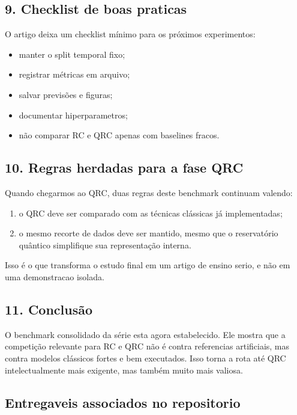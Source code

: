 \documentclass[12pt]{article}
\providecommand{\tightlist}{%
          \setlength{\itemsep}{0pt}\setlength{\parskip}{0pt}}
\begin{document}
\subsection{9. Checklist de boas praticas}\label{9-checklist-de-boas-praticas}

O artigo deixa um checklist mínimo para os próximos experimentos:

\begin{itemize}
\tightlist
\item
  manter o split temporal fixo;
\item
  registrar métricas em arquivo;
\item
  salvar previsões e figuras;
\item
  documentar hiperparametros;
\item
  não comparar RC e QRC apenas com baselines fracos.
\end{itemize}

\subsection{10. Regras herdadas para a fase QRC}\label{10-regras-herdadas-para-a-fase-qrc}

Quando chegarmos ao QRC, duas regras deste benchmark continuam valendo:

\begin{enumerate}
\def\labelenumi{\arabic{enumi}.}
\tightlist
\item
  o QRC deve ser comparado com as técnicas clássicas já implementadas;
\item
  o mesmo recorte de dados deve ser mantido, mesmo que o reservatório quântico simplifique sua representação interna.
\end{enumerate}

Isso é o que transforma o estudo final em um artigo de ensino serio, e não em uma demonstracao isolada.

\subsection{11. Conclusão}\label{11-conclusuxe3o}

O benchmark consolidado da série esta agora estabelecido. Ele mostra que a competição relevante para RC e QRC não é contra referencias artificiais, mas contra modelos clássicos fortes e bem executados. Isso torna a rota até QRC intelectualmente mais exigente, mas também muito mais valiosa.

\subsection{Entregaveis associados no repositorio}\label{entregaveis-associados-no-repositorio}
\end{document}
